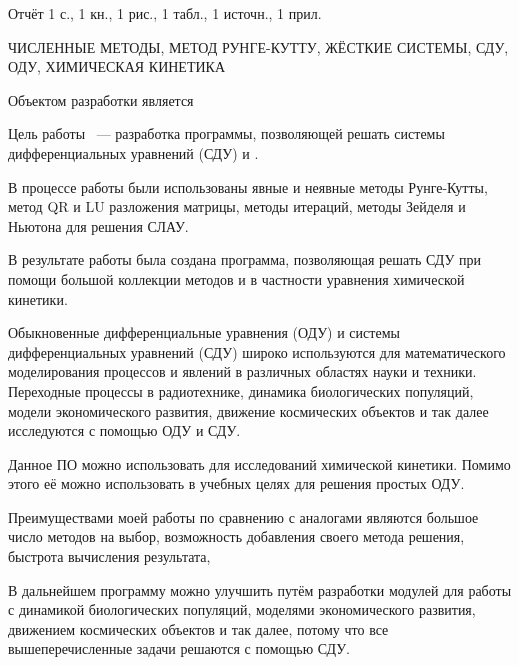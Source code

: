 \vkrAbstract

Отчёт 1 с., 1 кн., 1 рис., 1 табл., 1 источн., 1 прил.

ЧИСЛЕННЫЕ МЕТОДЫ, МЕТОД РУНГЕ-КУТТУ, ЖЁСТКИЕ СИСТЕМЫ, СДУ, ОДУ, ХИМИЧЕСКАЯ КИНЕТИКА

Объектом разработки является 

Цель работы ~--- разработка программы, позволяющей решать системы дифференциальных уравнений (СДУ) и .

В процессе работы были использованы явные и неявные методы Рунге-Кутты, метод QR и LU разложения матрицы, методы итераций, методы Зейделя и Ньютона для решения СЛАУ.

В результате работы была создана программа, позволяющая  решать СДУ при помощи большой коллекции методов и в частности уравнения химической кинетики.

Обыкновенные дифференциальные уравнения (ОДУ) и системы дифференциальных уравнений (СДУ) широко используются для математического моделирования процессов и явлений в различных областях науки и техники. Переходные процессы в радиотехнике, динамика биологических популяций, модели экономического развития, движение космических объектов и так далее исследуются с помощью ОДУ и СДУ.

Данное ПО можно использовать для исследований химической кинетики. Помимо этого её можно использовать в учебных целях для решения простых ОДУ.

Преимуществами моей работы по сравнению с аналогами являются большое число методов на выбор, возможность добавления своего метода решения, быстрота вычисления результата, 

В дальнейшем программу можно улучшить путём разработки модулей для работы с динамикой биологических популяций, моделями экономического развития, движением космических объектов и так далее, потому что все вышеперечисленные задачи решаются с помощью СДУ.